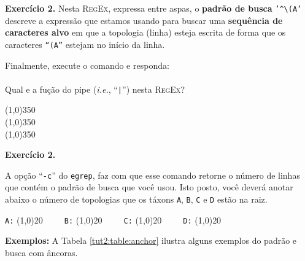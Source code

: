 \begin{refsection}
\begin{blackBlock}{\textbf{Exercício 2.}}
Nesta \textsc{RegEx}, expressa entre aspas, o \textbf{padrão de busca} \texttt{'\^{}\textbackslash (A'} descreve a expressão que estamos usando para buscar uma \textbf{sequência de caracteres alvo} em que a topologia (linha) esteja escrita de forma que os caracteres \texttt{``(A''} estejam no início da linha.

Finalmente, execute o comando e responda:\\
\\

Qual e a fução do pipe (\textit{i.e.}, ``\texttt{|}'') nesta \textsc{RegEx}?

\begin{center}
\line(1,0){350}\\
\line(1,0){350}\\
\line(1,0){350}\\
\end{center}

\end{blackBlock}

\vspace{15pt}

\begin{blackBlock}{\textbf{Exercício 2.}}\label{tut2:ex:9.\arabic{ex}}

A opção ``\texttt{-c}'' do \texttt{egrep}, faz com que esse comando retorne o número de linhas que contém o padrão de busca que você usou. Isto posto, você deverá anotar abaixo o número de topologias que os táxons \texttt{A}, \texttt{B}, \texttt{C} e \texttt{D} estão na raiz.\\

\begin{center}
\texttt{A:} \line(1,0){20}~~~~~\texttt{B:} \line(1,0){20}~~~~~\texttt{C:} \line(1,0){20}~~~~~\texttt{D:} \line(1,0){20} \\
\end{center}

\end{blackBlock}

\vspace{15pt}

\textbf{Exemplos:} A Tabela \ref{tut2:table:anchor} ilustra alguns exemplos do padrão e busca com âncoras.

\pagestyle{fancy}
\begin{center}


\end{center}
\end{refsection}
